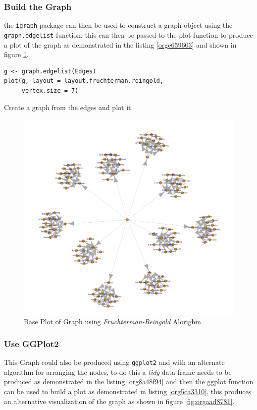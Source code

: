 \documentclass[11pt]{article}
\begin{document}
\subsubsection{Build the Graph}
\label{sec:org9e1bef7}
the \texttt{igraph} package can then be used to construct a graph object using the \texttt{graph.edgelist} function, this can then be passed to the plot function to produce a plot of the graph as demonstrated in the listing \ref{orge659603} and shown in figure \ref{fig:orgf9a2d28}.

\begin{listing}[htbp]
\begin{verbatim}
g <- graph.edgelist(Edges)
plot(g, layout = layout.fruchterman.reingold,
     vertex.size = 7)
\end{verbatim}
\caption{\label{orge659603}Create a graph from the edges and plot it.}
\end{listing}


\begin{figure}[htbp]
\centering
\includegraphics[width=12cm]{./Figures/Graph_Base_1.png}
\caption{\label{fig:orgf9a2d28}Base Plot of Graph using \emph{Fruchterman-Reingold} Alorighm}
\end{figure}

\subsubsection{Use GGPlot2}
\label{sec:orgc9d6b4e}
This Graph could also be produced using \texttt{ggplot2} and with an alternate algorithm for arranging the nodes,  to do this a \emph{tidy} data frame needs to be produced as demonstrated in the listing \ref{org8a48f94} and then the ggplot function can be used to build a plot as demonstrated in listing \ref{org5ca3310}, this produces an alternative visualization of the graph as shown in figure \ref{fig:orgaad8781}.
\end{document}
